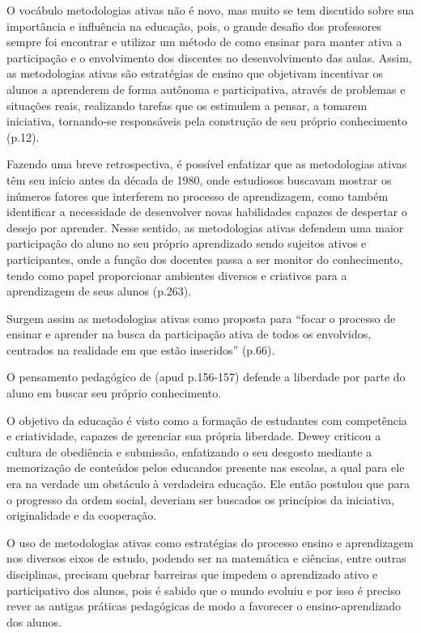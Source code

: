 O vocábulo metodologias ativas não é novo, mas muito se tem discutido sobre sua importância e influência na educação, pois, o grande desafio dos professores sempre foi encontrar e utilizar um método de como ensinar para manter ativa a participação e o envolvimento dos discentes no desenvolvimento das aulas. Assim, as metodologias ativas são estratégias de ensino que objetivam incentivar os alunos a aprenderem de forma autônoma e participativa, através de problemas e situações reais, realizando tarefas que os estimulem a pensar, a tomarem iniciativa, tornando-se responsáveis pela construção de seu próprio conhecimento \cite{DIESEL2017} (p.12).

Fazendo uma breve retrospectiva, é possível enfatizar que as metodologias ativas têm seu início antes da década de 1980, onde estudiosos buscavam mostrar os inúmeros fatores que interferem no processo de aprendizagem, como também identificar a necessidade de desenvolver novas habilidades capazes de despertar o desejo por aprender. Nesse sentido, as metodologias ativas defendem uma maior participação do aluno no seu próprio aprendizado sendo sujeitos ativos e participantes, onde a função dos docentes passa a ser monitor do conhecimento, tendo como papel proporcionar ambientes diversos e criativos para a aprendizagem de seus alunos \cite{Mota2018} (p.263).

Surgem assim as metodologias ativas como proposta para ``focar o processo de ensinar e aprender na busca da participação ativa de todos os envolvidos, centrados na realidade em que estão inseridos'' \cite{FIALHO2017} (p.66).

O pensamento pedagógico de  (apud \cite{LOVATO2018} p.156-157) defende a liberdade por parte do aluno em buscar seu próprio conhecimento.

\begin{citacao}
    O objetivo da educação é visto como a formação de estudantes com competência e criatividade, capazes de gerenciar sua própria liberdade. Dewey criticou a cultura de obediência e submissão, enfatizando o seu desgosto mediante a memorização de conteúdos pelos educandos presente nas escolas, a qual para ele era na verdade um obstáculo à verdadeira educação. Ele então postulou que para o progresso da ordem social, deveriam ser buscados os princípios da iniciativa, originalidade e da cooperação.
\end{citacao}

O uso de metodologias ativas como estratégias do processo ensino e aprendizagem nos diversos eixos de estudo, podendo ser na matemática e ciências, entre outras disciplinas, precisam quebrar barreiras que impedem o aprendizado ativo e participativo dos alunos, pois é sabido que o mundo evoluiu e por isso é preciso rever as antigas práticas pedagógicas de modo a favorecer o ensino-aprendizado dos alunos.


